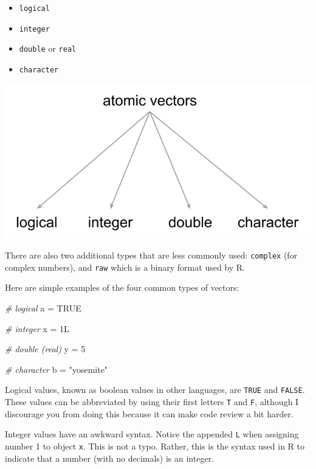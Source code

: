 \documentclass[
]{book}
\newenvironment{Shaded}{\begin{snugshade}}{\end{snugshade}}
\newcommand{\CommentTok}[1]{\textcolor[rgb]{0.56,0.35,0.01}{\textit{#1}}}
\newcommand{\ConstantTok}[1]{\textcolor[rgb]{0.00,0.00,0.00}{#1}}
\newcommand{\DecValTok}[1]{\textcolor[rgb]{0.00,0.00,0.81}{#1}}
\newcommand{\NormalTok}[1]{#1}
\newcommand{\OtherTok}[1]{\textcolor[rgb]{0.56,0.35,0.01}{#1}}
\newcommand{\StringTok}[1]{\textcolor[rgb]{0.31,0.60,0.02}{#1}}
\providecommand{\tightlist}{%
  \setlength{\itemsep}{0pt}\setlength{\parskip}{0pt}}
\begin{document}
\begin{itemize}
\tightlist
\item
  \texttt{logical}
\item
  \texttt{integer}
\item
  \texttt{double} or \texttt{real}
\item
  \texttt{character}
\end{itemize}

\begin{center}\includegraphics[width=0.55\linewidth]{images/objects/obj-vector-atomic-types} \end{center}

There are also two additional types that are less commonly used: \texttt{complex}
(for complex numbers), and \texttt{raw} which is a binary format used by R.

Here are simple examples of the four common types of vectors:

\begin{Shaded}
\begin{Highlighting}[]
\CommentTok{\# logical}
\NormalTok{a }\OtherTok{=} \ConstantTok{TRUE}

\CommentTok{\# integer}
\NormalTok{x }\OtherTok{=}\NormalTok{ 1L}

\CommentTok{\# double (real)}
\NormalTok{y }\OtherTok{=} \DecValTok{5}

\CommentTok{\# character}
\NormalTok{b }\OtherTok{=} \StringTok{"yosemite"}
\end{Highlighting}
\end{Shaded}

Logical values, known as boolean values in other languages, are \texttt{TRUE} and
\texttt{FALSE}. These values can be abbreviated by using their first letters \texttt{T} and
\texttt{F}, although I discourage you from doing this because it can make code review
a bit harder.

Integer values have an awkward syntax. Notice the appended \texttt{L} when assigning
number 1 to object \texttt{x}. This is not a typo. Rather, this is the syntax used in
R to indicate that a number (with no decimals) is an integer.
\end{document}
